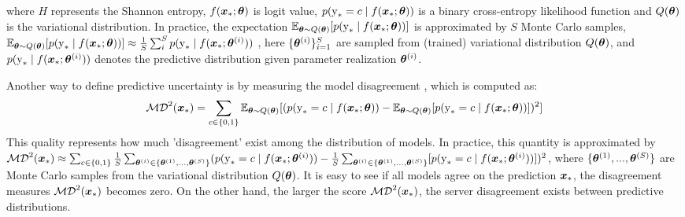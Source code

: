 \documentclass[10pt]{article} %
\begin{document}
where $H$ represents the Shannon entropy, $f({\bm{x}}_*;{\bm{\theta}})$ is logit value, $p({\textnormal{y}}_*=c \mid f({\bm{x}}_* ; {\bm{\theta}}))$ is a binary cross-entropy likelihood function and $Q({\bm{\theta}})$ is the variational distribution. In practice, the expectation $\mathbb{E}_{{\bm{\theta}} \sim Q({\bm{\theta}})}[p({\textnormal{y}}_* \mid f({\bm{x}}_* ; {\bm{\theta}}))]$ is approximated by $S$ Monte Carlo samples,
$\mathbb{E}_{{\bm{\theta}} \sim Q({\bm{\theta}})}[p({\textnormal{y}}_* \mid f({\bm{x}}_* ; {\bm{\theta}}))] \approx \frac{1}{S} \sum_i^S p({\textnormal{y}}_* \mid f({\bm{x}}_* ; {\bm{\theta}}^{(i)}))$ , here $\{{\bm{\theta}}^{(i)}\}_{i=1}^S$ are sampled from (trained) variational distribution $Q({\bm{\theta}})$, and $p({\textnormal{y}}_* \mid f({\bm{x}}_* ; {\bm{\theta}}^{(i)}))$ denotes the predictive distribution given parameter realization ${\bm{\theta}}^{\left(i\right)}$.

Another way to define predictive uncertainty is by measuring the model disagreement \citep{d2021repulsive}, which is computed as:
\begin{equation}
    \mathcal{MD}^2 ({\bm{x}}_*) = \sum_{c \in\{0,1\}} \mathbb{E}_{{\bm{\theta}} \sim Q({\bm{\theta}})}[(p({\textnormal{y}}_*=c \mid f({\bm{x}}_*; {\bm{\theta}})) - \mathbb{E}_{{\bm{\theta}} \sim Q({\bm{\theta}})}[p({\textnormal{y}}_* = c\mid f({\bm{x}}_* ; {\bm{\theta}}))])^2]
\end{equation}
This quality represents how much 'disagreement' exist among the distribution of models. In practice, this quantity is approximated by $\mathcal{MD}^2({\bm{x}}_*) \approx \sum_{c \in\{0,1\}} \frac{1}{S}\sum_{{\bm{\theta}}^{(i)} \in\{{\bm{\theta}}^{(1)},...,{\bm{\theta}}^{(S)}\}} (p({\textnormal{y}}_*=c \mid f({\bm{x}}_*; {\bm{\theta}}^{(i)})) - \frac{1}{S}\sum_{{\bm{\theta}}^{(i)} \in\{{\bm{\theta}}^{(1)},...,{\bm{\theta}}^{(S)}\}}[p({\textnormal{y}}_* = c\mid f({\bm{x}}_* ; {\bm{\theta}}^{(i)}))])^2$, where $\{{\bm{\theta}}^{(1)},...,{\bm{\theta}}^{(S)}\}$ are Monte Carlo samples from the variational distribution $Q({\bm{\theta}})$. It is easy to see if all models agree on the prediction ${\bm{x}}_*$, the disagreement measures $\mathcal{MD}^2 ({\bm{x}}_*)$ becomes zero. On the other hand, the larger the score $\mathcal{MD}^2 ({\bm{x}}_*)$, the server disagreement exists between predictive distributions.
\end{document}
